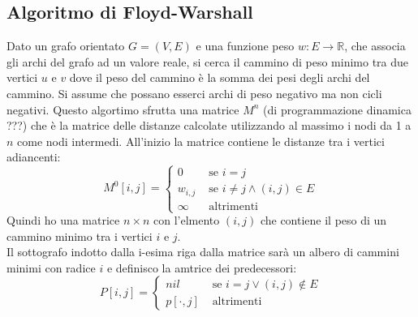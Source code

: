 \documentclass[a4paper,12pt, oneside]{book}
\begin{document}
\subsection{Algoritmo di Floyd-Warshall}
Dato un grafo orientato $G=(V,E)$ e una funzione peso $w:E\to
\mathbb{R}$, che associa gli archi del grafo ad un valore reale, si
cerca il cammino di peso minimo tra due vertici $u$ e $v$ dove il peso
del cammino è la somma dei pesi degli archi del cammino. Si assume che
possano esserci archi di peso negativo ma non cicli negativi. Questo
algortimo sfrutta una matrice $M^n$ (di programmazione dinamica ???)
che è la matrice delle distanze calcolate utilizzando al massimo i
nodi da 1 a $n$ come nodi intermedi. All'inizio la matrice contiene le
distanze tra i vertici adiancenti:
\[M^0[i,j]=
  \begin{cases}
    0 & \mbox{ se } i=j\\
    w_{i,j} & \mbox{ se } i\neq j \wedge (i,j)\in E\\
    \infty & \mbox{ altrimenti}
  \end{cases}
\]
Quindi ho una matrice $n\times n$ con l'elmento $(i,j)$ che contiene
il peso di un cammino minimo tra i vertici $i$ e $j$. \\
Il sottografo indotto dalla i-esima riga dalla matrice sarà un albero
di cammini minimi con radice $i$ e definisco la amtrice dei
predecessori:
\[P[i,j]=
  \begin{cases}
    nil & \mbox{ se } i=j\vee (i,j)\not\in E\\
    p[\cdot, j] & \mbox{ altrimenti}
  \end{cases}
\]
\end{document}
